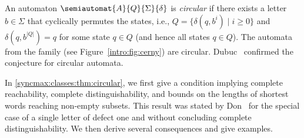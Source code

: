 
An automaton $\semiautomat{A}{Q}{\Sigma}{\delta}$ is \emph{circular}
if there exists a letter $b \in \Sigma$ 
that cyclically permutes the states, i.e., $Q = \{ \delta(q, b^i) \mid i \ge 0 \}$
and $\delta(q, b^{|Q|}) = q$ for some state $q \in Q$ (and hence all states $q \in Q$).
The automata from the \Cerny family (see Figure~\ref{intro:fig:cerny}) are circular.
Dubuc~\cite{Dubuc98} confirmed the \Cerny conjecture for circular automata.

In \cref{syncmax:classes:thm:circular}, we first give a condition implying complete reachability,
complete distinguishability, and bounds on the lengths of shortest words reaching non-empty subsets.
This result was stated by Don~\cite[Prop.~15]{Don16} for the special case of a single
letter of defect one and without concluding complete distinguishability.
We then derive several consequences and give examples.

